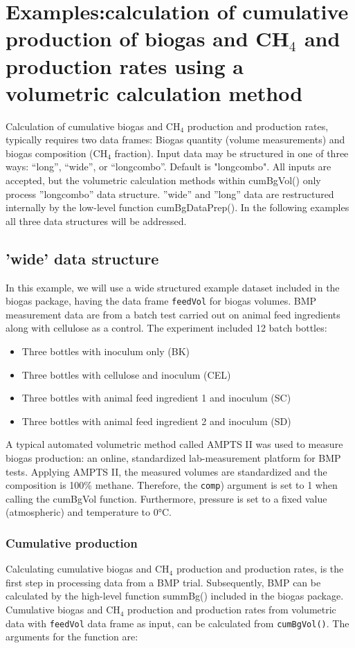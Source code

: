 \documentclass{article}
\begin{document}
\section{Examples:calculation of cumulative production of biogas and CH$_4$ and production rates using a volumetric calculation method}
Calculation of cumulative biogas and CH$_4$ production and production rates, typically requires two data frames: Biogas quantity (volume measurements) and biogas composition (CH$_4$ fraction).
Input data may be structured in one of three ways: ``long'', ``wide'', or ``longcombo''. Default is "longcombo". All inputs are accepted, but the volumetric calculation methods within cumBgVol() only process ''longcombo'' data structure. ''wide'' and ''long'' data are restructured internally by the low-level function cumBgDataPrep(). In the following examples all three data structures will be addressed.  

\newpage
\subsection{'wide' data structure}
In this example, we will use a wide structured example dataset included in the biogas package, having the data frame \texttt{feedVol} for biogas volumes. BMP measurement data are from a batch test carried out on animal feed ingredients along with cellulose as a control. 
The experiment included 12 batch bottles:
\begin{itemize}
  \item Three bottles with inoculum only (BK)
  \item Three bottles with cellulose and inoculum (CEL)
  \item Three bottles with animal feed ingredient 1 and inoculum (SC)
  \item Three bottles with animal feed ingredient 2 and inoculum (SD)
\end{itemize}

A typical automated volumetric method called AMPTS II was used to measure biogas production: an online, standardized lab-measurement platform for BMP tests. Applying AMPTS II, the measured volumes are standardized and the composition is 100\% methane. Therefore, the \texttt{comp}) argument is set to 1 when calling the cumBgVol function. Furthermore, pressure is set to a fixed value (atmospheric) and temperature to 0°C. 


\subsubsection*{Cumulative production}
Calculating cumulative biogas and CH$_4$ production and production rates, is the first step in processing data from a BMP trial. Subsequently, BMP can be calculated by the high-level function summBg() included in the biogas package.
Cumulative biogas and CH$_4$ production and production rates from volumetric data with \texttt{feedVol} data frame as input, can be calculated from \texttt{cumBgVol()}.
The arguments for the function are:
\end{document}
